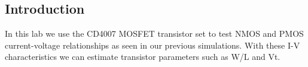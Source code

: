 \subsection{Introduction}
In this lab we use the CD4007 MOSFET transistor set to test NMOS and PMOS current-voltage relationships as seen in our previous simulations. With these I-V characteristics we can estimate transistor parameters such as W/L and Vt.
